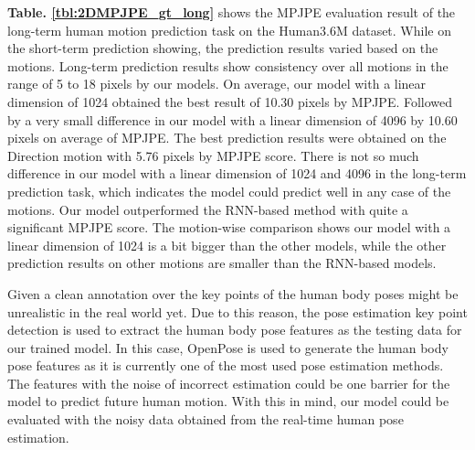 \textbf{Table. \ref{tbl:2DMPJPE_gt_long}} shows the MPJPE evaluation result of the long-term human motion prediction task on the Human3.6M dataset. While on the short-term prediction showing, the prediction results varied based on the motions. Long-term prediction results show consistency over all motions in the range of 5 to 18 pixels by our models. On average, our model with a linear dimension of 1024 obtained the best result of 10.30 pixels by MPJPE. Followed by a very small difference in our model with a linear dimension of 4096 by 10.60 pixels on average of MPJPE. The best prediction results were obtained on the Direction motion with 5.76 pixels by MPJPE score. There is not so much difference in our model with a linear dimension of 1024 and 4096 in the long-term prediction task, which indicates the model could predict well in any case of the motions. Our model outperformed the RNN-based method with quite a significant MPJPE score. The motion-wise comparison shows our model with a linear dimension of 1024 is a bit bigger than the other models, while the other prediction results on other motions are smaller than the RNN-based models. 

Given a clean annotation over the key points of the human body poses might be unrealistic in the real world yet. Due to this reason, the pose estimation key point detection is used to extract the human body pose features as the testing data for our trained model. In this case, OpenPose is used to generate the human body pose features as it is currently one of the most used pose estimation methods. The features with the noise of incorrect estimation could be one barrier for the model to predict future human motion. With this in mind, our model could be evaluated with the noisy data obtained from the real-time human pose estimation. 

